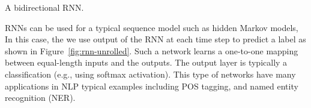 \begin{marginfigure}
  \caption{A bidirectional RNN.} 
  \label{fig:bidirectional-rnn}
\end{marginfigure}

RNNs can be used for a typical sequence model such as hidden Markov models,
In this case, the we use output of the RNN at each time step
to predict a label as shown in Figure~\ref{fig:rnn-unrolled}.
Such a network learns a one-to-one mapping
between equal-length inputs and the outputs.
The output layer is typically a classification
(e.g., using softmax activation).
This type of networks have many applications in NLP
typical examples including POS tagging, and named entity recognition (NER).


